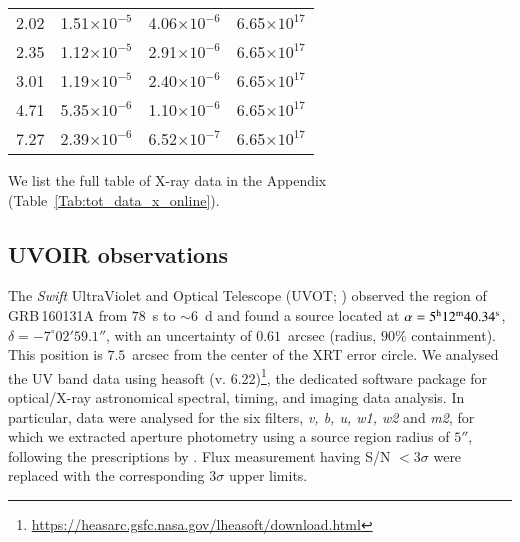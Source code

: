 \documentclass{aa}
\begin{document}
{\begin{longtable}{c|c|c|c}
2.02                 & 1.51$\times 10^{-5}$ & 4.06$\times 10^{-6}$ & 6.65$\times 10^{17}$  \\
2.35                 & 1.12$\times 10^{-5}$ & 2.91$\times 10^{-6}$ & 6.65$\times 10^{17}$  \\
3.01                 & 1.19$\times 10^{-5}$ & 2.40$\times 10^{-6}$ & 6.65$\times 10^{17}$  \\
4.71                 & 5.35$\times 10^{-6}$ & 1.10$\times 10^{-6}$ & 6.65$\times 10^{17}$  \\
7.27                 & 2.39$\times 10^{-6}$ & 6.52$\times 10^{-7}$ & 6.65$\times 10^{17}$  \\
\end{longtable}
}%
%
We list the full table of X-ray data in the Appendix (Table~\ref{Tab:tot_data_x_online}).


\subsection{UVOIR observations}
\label{subsec:UVOT}

The {\it Swift} UltraViolet and Optical Telescope (UVOT; \citealt{Roming05}) observed the region of GRB\,160131A from $78$~s to $\sim 6$~d and found a source located at $\alpha=5^{\rm h}12^{\rm m}40.34^{\rm s}$, $\delta=-7^{\circ}02'59.1''$, with an uncertainty of $0.61$~arcsec (radius, $90 \%$ containment).
This position is $7.5$~arcsec from the center of the XRT error circle.
We analysed the UV band data using {\sc heasoft} (v. 6.22)\footnote{\url{https://heasarc.gsfc.nasa.gov/lheasoft/download.html}}, the dedicated software package for optical/X-ray astronomical spectral, timing, and imaging data analysis.
In particular, data were analysed for the six filters, {\it v, b, u, w1, w2} and {\it m2}, for which we extracted aperture photometry using a source region radius of $5''$, following the prescriptions by \citet{Brown09,Breeveld11}. Flux measurement having S/N $<3\sigma$ were replaced with the corresponding $3\sigma$ upper limits.
\end{document}
